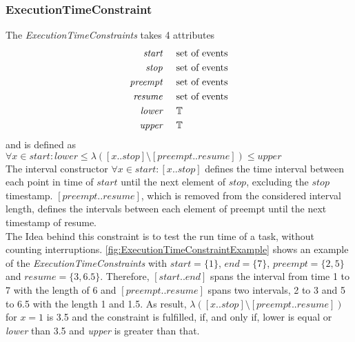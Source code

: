 	\subsubsection{ExecutionTimeConstraint}
		The \emph{ExecutionTimeConstraints} takes 4 attributes
		\begin{align*}
			\emph{start} & \hspace{.5cm}\text{set of events}\\
			\emph{stop} & \hspace{.5cm}\text{set of events}\\
			\emph{preempt} & \hspace{.5cm}\text{set of events}\\
			\emph{resume} & \hspace{.5cm}\text{set of events}\\
			\emph{lower} & \hspace{.5cm}\mathbb{T}\\
			\emph{upper} & \hspace{.5cm}\mathbb{T}\\
		\end{align*}
		and is defined as\\[10pt]
		\begin{math}
			\forall x\in start: lower\leq \lambda([x..stop]\setminus[preempt..resume]) \leq upper
		\end{math}\\[10pt]
		The interval constructor $\forall x\in start: [x..stop]$ defines the time interval between each point in time of $start$ until the next element of $stop$, excluding the $stop$ timestamp. $[preempt..resume]$, which is removed from the considered interval length, defines the intervals between each element of preempt until the next timestamp of resume.\\
		The Idea behind this constraint is to test the run time of a task, without counting interruptions.
		\ref{fig:ExecutionTimeConstraintExample} shows an example of the \emph{ExecutionTimeConstraints} with $start=\{1\}$, $end=\{7\}$, $preempt=\{2, 5\}$ and $resume = \{3, 6.5\}$. Therefore, $[start..end]$ spans the interval from time 1 to 7 with the length of 6 and $[preempt..resume]$ spans two intervals, 2 to 3 and 5 to 6.5 with the length 1 and 1.5. As result, $\lambda([x..stop]\setminus[preempt..resume])$ for $x = 1$ is 3.5 and the constraint is fulfilled, if, and only if, lower is equal or \emph{lower} than 3.5 and \emph{upper} is greater than that.\\
